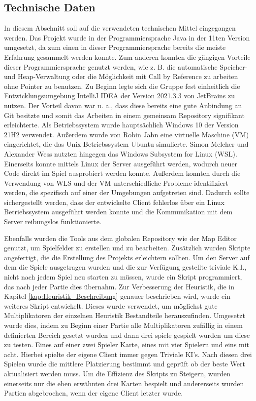 \documentclass[12pt,a4paper,bibliography=totocnumbered,listof=totocnumbered]{article}
\begin{document}
\subsection{Technische Daten}
In diesem Abschnitt soll auf die verwendeten technischen Mittel eingegangen werden. Das Projekt wurde in der Programmiersprache Java in der 11ten Version umgesetzt, da zum einen in dieser Programmiersprache bereits die meiste Erfahrung gesammelt werden konnte. Zum anderen konnten die gängigen Vorteile dieser Programmiersprache genutzt werden, wie z. B. die automatische Speicher- und Heap-Verwaltung oder die Möglichkeit mit \glqq Call by Reference\grqq{} zu arbeiten ohne Pointer zu benutzen.
Zu Beginn legte sich die Gruppe fest einheitlich die Entwicklungsumgebung IntelliJ IDEA der Version 2021.3.3 von JetBrains zu nutzen. Der Vorteil davon war u. a., dass diese bereits eine gute Anbindung an Git besitzte und somit das Arbeiten in einem gemeinsam Repository signifikant erleichterte.
Als Betriebssystem wurde hauptsächlich Windows 10 der Version 21H2 verwendet. Außerdem wurde von Robin Jahn eine virtuelle Maschine (VM) eingerichtet, die das Unix Betriebssystem Ubuntu simulierte. Simon Melcher und Alexander Wess nutzten hingegen das Windows Subsystem for Linux (WSL). Einerseits konnte mittels Linux der Server ausgeführt werden, wodurch neuer Code direkt im Spiel ausprobiert werden konnte. Außerdem konnten durch die Verwendung von WLS und der VM unterschiedliche Probleme identifiziert werden, die spezifisch auf einer der Umgebungen aufgetreten sind. Dadurch sollte sichergestellt werden, dass der entwickelte Client fehlerlos über ein Linux Betriebssystem ausgeführt werden konnte und die Kommunikation mit dem Server reibungslos funktionierte.

Ebenfalls wurden die Tools aus dem globalen Repository wie der Map Editor genutzt, um Spielfelder zu erstellen und zu bearbeiten. Zusätzlich wurden Skripte angefertigt, die die Erstellung des Projekts erleichtern sollten. Um den Server auf dem die Spiele ausgetragen wurden und die zur Verfügung gestellte triviale K.I., nicht nach jedem Spiel neu starten zu müssen, wurde ein Skript programmiert, das nach jeder Partie dies übernahm. Zur Verbesserung der Heuristik, die in Kapitel \ref{kap:Heuristik_Beschreibung} genauer beschrieben wird, wurde ein weiteres Skript entwickelt. Dieses wurde verwendet, um möglichst gute Multiplikatoren der einzelnen Heuristik Bestandteile herauszufinden. Umgesetzt wurde dies, indem zu Beginn einer Partie alle Multiplikatoren zufällig in einem definierten Bereich gesetzt wurden und dann drei spiele gespielt wurden um diese zu testen. Eines auf einer zwei Spieler Karte, eines mit vier Spielern und eins mit acht. Hierbei spielte der eigene Client immer gegen Triviale KI's. Nach diesen drei Spielen wurde die mittlere Platzierung bestimmt und geprüft ob der beste Wert aktualisiert werden muss. Um die Effizienz des Skripts zu Steigern, wurden einerseits nur die eben erwähnten drei Karten bespielt und andererseits wurden Partien abgebrochen, wenn der eigene Client letzter wurde.
\end{document}
